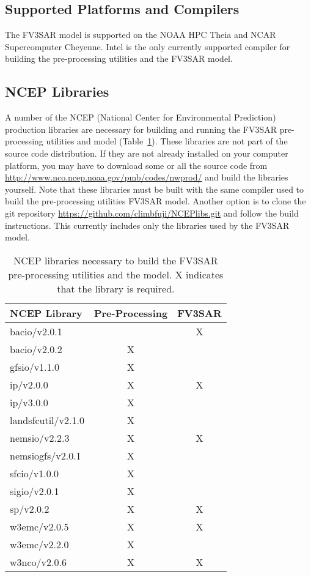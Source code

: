 \subsection{Supported Platforms and Compilers}

The FV3SAR model is supported on the NOAA HPC Theia and NCAR Supercomputer Cheyenne.  Intel is the only
currently supported compiler for building the pre-processing utilities and the FV3SAR model.

\subsection{NCEP Libraries}

A number of the NCEP (National Center for Environmental Prediction) production libraries are necessary
for building and running the FV3SAR pre-processing utilities and model (Table~\ref{tab:ncep_libs}).
These libraries are not part of the source code distribution.
If they are not already installed on your computer platform, you may have to download some or all the
source code from \url{http://www.nco.ncep.noaa.gov/pmb/codes/nwprod/} and build the libraries yourself.
Note that these libraries must be built with the same compiler used to build the pre-processing utilities
FV3SAR model.
Another option is to clone the git repository \url{https://github.com/climbfuji/NCEPlibs.git} and follow
the build instructions.  This currently includes only the libraries used by the FV3SAR model.

\begin{table}[!htb]
\begin{center}
\begin{tabular}{ l c c }
\hline
 NCEP Library & Pre-Processing & FV3SAR \\ 
\hline
 bacio/v2.0.1       &   & X \\ 
 bacio/v2.0.2       & X &   \\ 
 gfsio/v1.1.0       & X &   \\ 
 ip/v2.0.0          & X & X \\  
 ip/v3.0.0          & X &   \\  
 landsfcutil/v2.1.0 & X &   \\ 
 nemsio/v2.2.3      & X & X \\ 
 nemsiogfs/v2.0.1   & X &   \\ 
 sfcio/v1.0.0       & X &   \\ 
 sigio/v2.0.1       & X &   \\ 
 sp/v2.0.2          & X & X \\ 
 w3emc/v2.0.5       & X & X \\   
 w3emc/v2.2.0       & X &   \\   
 w3nco/v2.0.6       & X & X \\
\hline
\end{tabular}
\caption{\label{tab:ncep_libs}NCEP libraries necessary to build the FV3SAR pre-processing utilities and the model.
                              X indicates that the library is required.}
\end{center}
\end{table}

